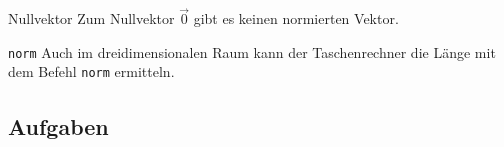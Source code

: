 \begin{bemerkung}{Nullvektor}{}
  Zum Nullvektor $\vec{0}$ gibt es keinen normierten Vektor.
\end{bemerkung}

\begin{bemerkung}{\texttt{norm}}{}
Auch im dreidimensionalen Raum kann der Taschenrechner die Länge mit
dem Befehl \texttt{norm} ermitteln.
\end{bemerkung}

\subsection*{Aufgaben}

